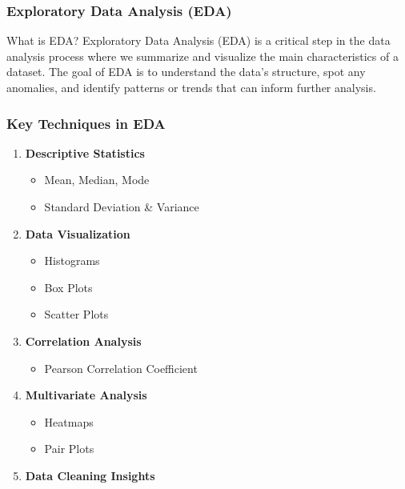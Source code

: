 \documentclass{beamer}
\begin{document}
\begin{frame}
    \frametitle{Exploratory Data Analysis (EDA)}
    \begin{block}{What is EDA?}
        Exploratory Data Analysis (EDA) is a critical step in the data analysis process where we summarize and visualize the main characteristics of a dataset. The goal of EDA is to understand the data’s structure, spot any anomalies, and identify patterns or trends that can inform further analysis.
    \end{block}
\end{frame}

\begin{frame}
    \frametitle{Key Techniques in EDA}
    \begin{enumerate}
        \item \textbf{Descriptive Statistics}
            \begin{itemize}
                \item Mean, Median, Mode
                \item Standard Deviation \& Variance
            \end{itemize}
            
        \item \textbf{Data Visualization}
            \begin{itemize}
                \item Histograms
                \item Box Plots
                \item Scatter Plots
            \end{itemize}
        
        \item \textbf{Correlation Analysis}
            \begin{itemize}
                \item Pearson Correlation Coefficient
            \end{itemize}
    
        \item \textbf{Multivariate Analysis}
            \begin{itemize}
                \item Heatmaps
                \item Pair Plots
            \end{itemize}
        
        \item \textbf{Data Cleaning Insights}
    \end{enumerate}
\end{frame}
\end{document}
